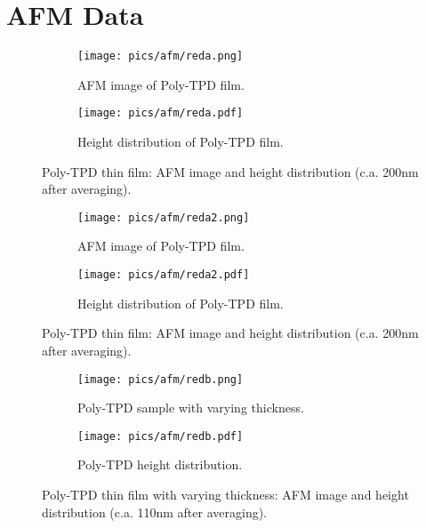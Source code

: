 \appendix



\chapter{AFM Data}

\begin{figure}[!htb]
\centering
\begin{subfigure}[t]{.5\textwidth}
  \centering
  \texttt{[image: pics/afm/reda.png]}
  \caption{AFM image of Poly-TPD film.}
  \label{PolyTPD_AFM}
\end{subfigure}%
\begin{subfigure}[t]{.5\textwidth}
  \centering
  \texttt{[image: pics/afm/reda.pdf]}
  \caption{Height distribution of Poly-TPD film.}
  \label{PolyTPD_HeightDist}
\end{subfigure}
\caption{Poly-TPD thin film: AFM image and height distribution (c.a. 200nm after averaging).}
\end{figure}

\begin{figure}[!htb]
\centering
\begin{subfigure}[t]{.5\textwidth}
  \centering
  \texttt{[image: pics/afm/reda2.png]}
  \caption{AFM image of Poly-TPD film.}
  \label{PolyTPD_AFM}
\end{subfigure}%
\begin{subfigure}[t]{.5\textwidth}
  \centering
  \texttt{[image: pics/afm/reda2.pdf]}
  \caption{Height distribution of Poly-TPD film.}
  \label{PolyTPD_HeightDist}
\end{subfigure}
\caption{Poly-TPD thin film: AFM image and height distribution (c.a. 200nm after averaging).}
\end{figure}



\begin{figure}[!htb]
\centering
\begin{subfigure}[t]{.5\textwidth}
  \centering
  \texttt{[image: pics/afm/redb.png]}
  \caption{Poly-TPD sample with varying thickness.}
  \label{PolyTPD_VaryingThickness}
\end{subfigure}%
\begin{subfigure}[t]{.5\textwidth}
  \centering
  \texttt{[image: pics/afm/redb.pdf]}
  \caption{Poly-TPD height distribution.}
  \label{PolyTPD_HeightDistRedb}
\end{subfigure}
\caption{Poly-TPD thin film with varying thickness: AFM image and height distribution (c.a. 110nm after averaging).}
\end{figure}

